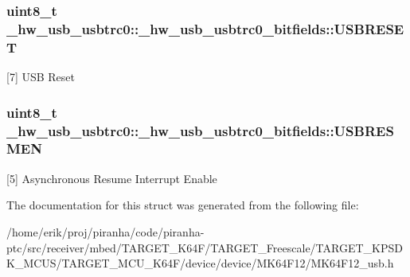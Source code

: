 \subsubsection[{\texorpdfstring{U\+S\+B\+R\+E\+S\+ET}{USBRESET}}]{\setlength{\rightskip}{0pt plus 5cm}uint8\+\_\+t \+\_\+hw\+\_\+usb\+\_\+usbtrc0\+::\+\_\+hw\+\_\+usb\+\_\+usbtrc0\+\_\+bitfields\+::\+U\+S\+B\+R\+E\+S\+ET}\hypertarget{struct__hw__usb__usbtrc0_1_1__hw__usb__usbtrc0__bitfields_ab580916f5030cb8f673944aa957e060c}{}\label{struct__hw__usb__usbtrc0_1_1__hw__usb__usbtrc0__bitfields_ab580916f5030cb8f673944aa957e060c}
\mbox{[}7\mbox{]} U\+SB Reset 
\subsubsection[{\texorpdfstring{U\+S\+B\+R\+E\+S\+M\+EN}{USBRESMEN}}]{\setlength{\rightskip}{0pt plus 5cm}uint8\+\_\+t \+\_\+hw\+\_\+usb\+\_\+usbtrc0\+::\+\_\+hw\+\_\+usb\+\_\+usbtrc0\+\_\+bitfields\+::\+U\+S\+B\+R\+E\+S\+M\+EN}\hypertarget{struct__hw__usb__usbtrc0_1_1__hw__usb__usbtrc0__bitfields_ab0384a192a782ff6ed48570b12031103}{}\label{struct__hw__usb__usbtrc0_1_1__hw__usb__usbtrc0__bitfields_ab0384a192a782ff6ed48570b12031103}
\mbox{[}5\mbox{]} Asynchronous Resume Interrupt Enable 

The documentation for this struct was generated from the following file\+:\begin{DoxyCompactItemize}
\item 
/home/erik/proj/piranha/code/piranha-\/ptc/src/receiver/mbed/\+T\+A\+R\+G\+E\+T\+\_\+\+K64\+F/\+T\+A\+R\+G\+E\+T\+\_\+\+Freescale/\+T\+A\+R\+G\+E\+T\+\_\+\+K\+P\+S\+D\+K\+\_\+\+M\+C\+U\+S/\+T\+A\+R\+G\+E\+T\+\_\+\+M\+C\+U\+\_\+\+K64\+F/device/device/\+M\+K64\+F12/M\+K64\+F12\+\_\+usb.\+h\end{DoxyCompactItemize}
